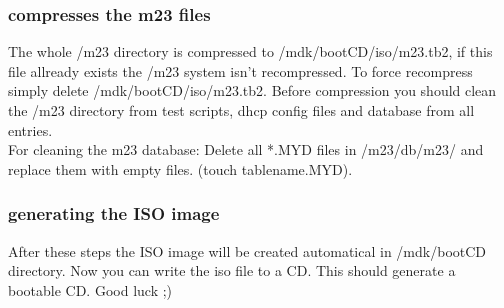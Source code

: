 \subsubsection{compresses the m23 files}
The whole /m23 directory is compressed to /mdk/bootCD/iso/m23.tb2, if this file allready exists the /m23 system isn't recompressed. To force recompress simply delete /mdk/bootCD/iso/m23.tb2. Before compression you should clean the /m23 directory from test scripts, dhcp config files and database from all entries.\\
For cleaning the m23 database: Delete all *.MYD files in /m23/db/m23/ and replace them with empty files. (touch tablename.MYD).
\subsubsection{generating the ISO image}
After these steps the ISO image will be created automatical in /mdk/bootCD directory. Now you can write the iso file to a CD. This should generate a bootable CD. Good luck ;)